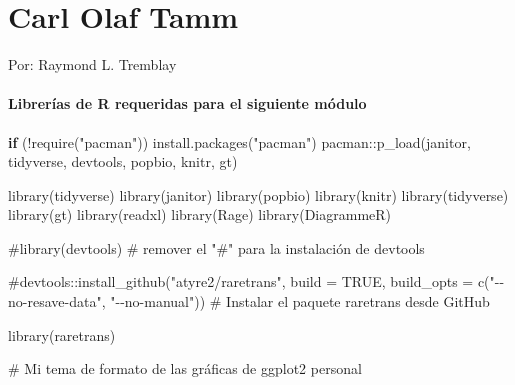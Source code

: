 \documentclass[
  12pt,
  letterpaper,
]{book}
\author{}
\date{}
\newenvironment{Shaded}{\begin{snugshade}}{\end{snugshade}}
\newcommand{\CommentTok}[1]{\textcolor[rgb]{0.37,0.37,0.37}{#1}}
\newcommand{\ControlFlowTok}[1]{\textcolor[rgb]{0.00,0.23,0.31}{\textbf{#1}}}
\newcommand{\FunctionTok}[1]{\textcolor[rgb]{0.28,0.35,0.67}{#1}}
\newcommand{\NormalTok}[1]{\textcolor[rgb]{0.00,0.23,0.31}{#1}}
\newcommand{\SpecialCharTok}[1]{\textcolor[rgb]{0.37,0.37,0.37}{#1}}
\newcommand{\StringTok}[1]{\textcolor[rgb]{0.13,0.47,0.30}{#1}}
\renewcommand*\contentsname{Table of contents}
\newcommand\contentsname{Table of contents}
\begin{document}
\frontmatter

\renewcommand*\contentsname{Table of contents}
{
\hypersetup{linkcolor=}
\setcounter{tocdepth}{2}
\tableofcontents
}

\mainmatter
\chapter{Carl Olaf Tamm}\label{OTamm}

Por: Raymond L. Tremblay

\subsubsection{Librerías de R requeridas para el siguiente
módulo}\label{libreruxedas-de-r-requeridas-para-el-siguiente-muxf3dulo}

\begin{Shaded}
\begin{Highlighting}[]
\ControlFlowTok{if}\NormalTok{ (}\SpecialCharTok{!}\FunctionTok{require}\NormalTok{(}\StringTok{"pacman"}\NormalTok{)) }\FunctionTok{install.packages}\NormalTok{(}\StringTok{"pacman"}\NormalTok{)}
\NormalTok{pacman}\SpecialCharTok{::}\FunctionTok{p\_load}\NormalTok{(janitor, tidyverse, devtools, popbio, knitr, gt)}

\FunctionTok{library}\NormalTok{(tidyverse)}
\FunctionTok{library}\NormalTok{(janitor)}
\FunctionTok{library}\NormalTok{(popbio)}
\FunctionTok{library}\NormalTok{(knitr)}
\FunctionTok{library}\NormalTok{(tidyverse)}
\FunctionTok{library}\NormalTok{(gt)}
\FunctionTok{library}\NormalTok{(readxl)}
\FunctionTok{library}\NormalTok{(Rage)}
\FunctionTok{library}\NormalTok{(DiagrammeR)}

\CommentTok{\#library(devtools) \# remover el "\#" para la instalación de devtools}

\CommentTok{\#devtools::install\_github("atyre2/raretrans", build = TRUE, build\_opts = c("{-}{-}no{-}resave{-}data", "{-}{-}no{-}manual")) \# Instalar el paquete \textquotesingle{}raretrans\textquotesingle{} desde GitHub}

\FunctionTok{library}\NormalTok{(raretrans)}

\CommentTok{\# Mi tema de formato de las gráficas de ggplot2 personal}


\end{Highlighting}
\end{Shaded}
\end{document}
